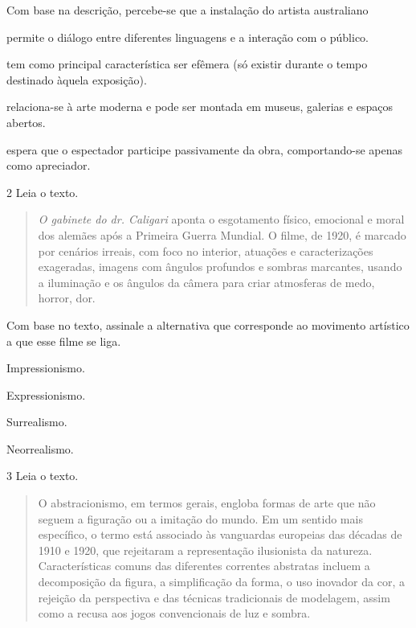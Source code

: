 Com base na descrição, percebe-se que a instalação do artista australiano

\begin{escolha}
\item
  permite o diálogo entre diferentes linguagens e a interação com o
  público.
\item
  tem como principal característica ser efêmera (só existir durante o
  tempo destinado àquela exposição).
\item
  relaciona-se à arte moderna e pode ser montada em museus, galerias e
  espaços abertos.
\item
  espera que o espectador participe passivamente da obra, comportando-se apenas como
  apreciador.
\end{escolha}

\pagebreak
\num{2} Leia o texto.

\begin{quote}
\emph{O gabinete do dr. Caligari} aponta o esgotamento físico, emocional e moral dos alemães após a Primeira Guerra Mundial. O filme, de 1920, é marcado por
cenários irreais, com foco no interior, atuações e caracterizações
exageradas, imagens com ângulos profundos e sombras marcantes, usando a
iluminação e os ângulos da câmera para criar atmosferas de medo, horror,
dor.

\end{quote}

Com base no texto, assinale a alternativa que corresponde ao movimento artístico a que esse filme se liga.

\begin{escolha}
\item
  Impressionismo.
\item
  Expressionismo.
\item
  Surrealismo.
\item
  Neorrealismo.
\end{escolha}

\num{3}  Leia o texto.

\begin{quote}
O abstracionismo, em termos gerais, engloba formas de arte que não seguem a figuração ou a imitação do mundo. Em um sentido mais específico, o termo está associado às vanguardas europeias das décadas de 1910 e 1920, que rejeitaram a representação ilusionista da natureza. Características comuns das diferentes correntes abstratas incluem a decomposição da figura, a simplificação da forma, o uso inovador da cor, a rejeição da perspectiva e das técnicas tradicionais de modelagem, assim como a recusa aos jogos convencionais de luz e sombra.

\end{quote}

